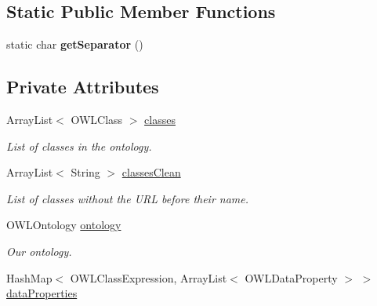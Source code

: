 \subsection*{Static Public Member Functions}
\begin{DoxyCompactItemize}
\item 
\hypertarget{class_ontology_1_1_data_property_adf0cae9ddf1db737f1ddeebd803e9c95}{
static char {\bfseries getSeparator} ()}
\label{class_ontology_1_1_data_property_adf0cae9ddf1db737f1ddeebd803e9c95}

\end{DoxyCompactItemize}
\subsection*{Private Attributes}
\begin{DoxyCompactItemize}
\item 
\hypertarget{class_ontology_1_1_data_property_ad6a04d3cfaaaa1b82b085761e298b1d9}{
ArrayList$<$ OWLClass $>$ \hyperlink{class_ontology_1_1_data_property_ad6a04d3cfaaaa1b82b085761e298b1d9}{classes}}
\label{class_ontology_1_1_data_property_ad6a04d3cfaaaa1b82b085761e298b1d9}

\begin{DoxyCompactList}\small\item\em List of classes in the ontology. \end{DoxyCompactList}\item 
\hypertarget{class_ontology_1_1_data_property_a425c129759217bc744f9c57d0f2d0c0f}{
ArrayList$<$ String $>$ \hyperlink{class_ontology_1_1_data_property_a425c129759217bc744f9c57d0f2d0c0f}{classesClean}}
\label{class_ontology_1_1_data_property_a425c129759217bc744f9c57d0f2d0c0f}

\begin{DoxyCompactList}\small\item\em List of classes without the URL before their name. \end{DoxyCompactList}\item 
\hypertarget{class_ontology_1_1_data_property_aa05bcaca9a48cd30101617e86f4dda41}{
OWLOntology \hyperlink{class_ontology_1_1_data_property_aa05bcaca9a48cd30101617e86f4dda41}{ontology}}
\label{class_ontology_1_1_data_property_aa05bcaca9a48cd30101617e86f4dda41}

\begin{DoxyCompactList}\small\item\em Our ontology. \end{DoxyCompactList}\item 
\hypertarget{class_ontology_1_1_data_property_af2428254ca584e305288b51f6645e250}{
HashMap$<$ OWLClassExpression, ArrayList$<$ OWLDataProperty $>$ $>$ \hyperlink{class_ontology_1_1_data_property_af2428254ca584e305288b51f6645e250}{dataProperties}}
\label{class_ontology_1_1_data_property_af2428254ca584e305288b51f6645e250}


\end{DoxyCompactItemize}
